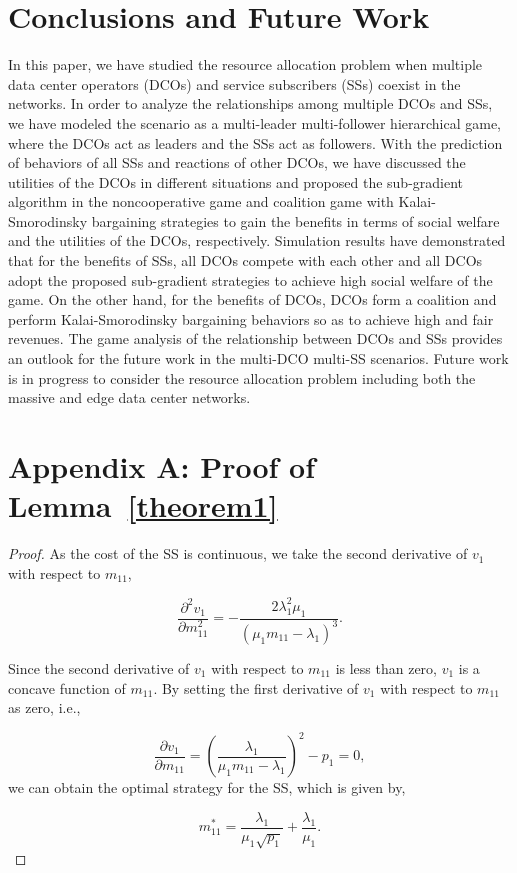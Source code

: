 \documentclass[twocolumn,10pt]{IEEEtran}
\newtheorem{proof}{Proof}
\begin{document}
\section{Conclusions and Future Work}\label{sec:conclusion}

In this paper, we have studied the resource allocation problem when multiple data center operators (DCOs) and service subscribers (SSs)    coexist in the networks. In order to analyze the relationships among multiple DCOs and SSs, we have modeled the scenario as a multi-leader multi-follower hierarchical game, where the DCOs act as leaders and the SSs act as followers. With the prediction of behaviors of all SSs and reactions of other DCOs, we have discussed the utilities of the DCOs in different situations and proposed the sub-gradient algorithm in the noncooperative game and coalition game with Kalai-Smorodinsky bargaining strategies to gain the benefits in terms of social welfare and the utilities of the DCOs, respectively. Simulation results have demonstrated that for the benefits of SSs, all DCOs compete with each other and all DCOs adopt the proposed sub-gradient strategies to achieve high social welfare of the game. On the other hand, for the benefits of DCOs, DCOs form a coalition and perform Kalai-Smorodinsky bargaining behaviors so as to achieve high and fair revenues. The game analysis of the relationship between DCOs and SSs provides an outlook for the future work in the multi-DCO multi-SS scenarios. Future work is in progress to consider the resource allocation problem including both the massive and edge data center networks.

\section*{Appendix A: Proof of Lemma~\ref{theorem1}}
\begin{proof}
As the cost of the SS is continuous, we take the second derivative of $v_{1}$ with respect to $m_{11}$,

\begin{equation}
   \frac{{{\partial ^2}{v_{1}}}}{{\partial m_{11}^2}} =  - \frac{{2\lambda _{1}^2{\mu _1}}}{{{{({\mu _1}{m_{11}} - {\lambda _{1}})}^3}}}.
\end{equation}

Since the second derivative of $v_{1}$ with respect to $m_{11}$ is less than zero, $v_{1}$ is a concave function of $m_{11}$. By setting the first derivative of $v_{1}$ with respect to $m_{11}$ as zero, i.e.,

\begin{equation}
   \frac{{\partial {v_{1}}}}{{\partial {m_{11}}}} = {\left( {\frac{{\lambda _{1}}}{{{\mu _1}{m_{11}} - {\lambda _{1}}}}} \right)^2} - {p_1} = 0,
\end{equation}
we can obtain the optimal strategy for the SS, which is given by,

\begin{equation}
    m_{11}^*=\frac{{{\lambda _{1}}}}{{{\mu _1}\sqrt {{p_1}} }} + \frac{{{\lambda _{1}}}}{{{\mu _1}}}.
\end{equation}
\end{proof}
\end{document}
